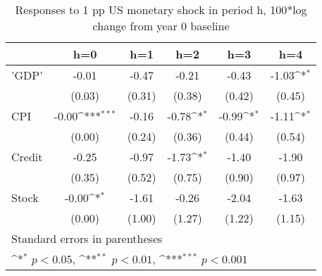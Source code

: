 \begin{table}[htbp]\centering
\def\sym#1{\ifmmode^{#1}\else\(^{#1}\)\fi}
\caption{Responses to 1 pp US monetary shock in period h, 100*log change from year 0 baseline}
\begin{tabular}{l*{5}{c}}
\hline\hline
            &\multicolumn{1}{c}{h=0}&\multicolumn{1}{c}{h=1}&\multicolumn{1}{c}{h=2}&\multicolumn{1}{c}{h=3}&\multicolumn{1}{c}{h=4}\\
\hline
'GDP'       &       -0.01         &       -0.47         &       -0.21         &       -0.43         &       -1.03\sym{*}  \\
            &      (0.03)         &      (0.31)         &      (0.38)         &      (0.42)         &      (0.45)         \\
[1em]
CPI         &       -0.00\sym{***}&       -0.16         &       -0.78\sym{*}  &       -0.99\sym{*}  &       -1.11\sym{*}  \\
            &      (0.00)         &      (0.24)         &      (0.36)         &      (0.44)         &      (0.54)         \\
[1em]
Credit      &       -0.25         &       -0.97         &       -1.73\sym{*}  &       -1.40         &       -1.90         \\
            &      (0.35)         &      (0.52)         &      (0.75)         &      (0.90)         &      (0.97)         \\
[1em]
Stock       &       -0.00\sym{*}  &       -1.61         &       -0.26         &       -2.04         &       -1.63         \\
            &      (0.00)         &      (1.00)         &      (1.27)         &      (1.22)         &      (1.15)         \\
\hline\hline
\multicolumn{6}{l}{\footnotesize Standard errors in parentheses}\\
\multicolumn{6}{l}{\footnotesize \sym{*} \(p<0.05\), \sym{**} \(p<0.01\), \sym{***} \(p<0.001\)}\\
\end{tabular}
\end{table}
